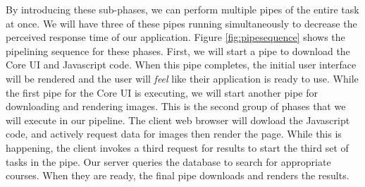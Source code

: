 By introducing these sub-phases, we can perform multiple pipes of the entire
task at once. We will have three of these pipes running simultaneously to
decrease the perceived response time of our application. Figure
\ref{fig:pipesequence} shows the pipelining sequence for these phases. First, we
will start a pipe to download the Core UI and Javascript code. When this pipe
completes, the initial user interface will be rendered and the user will
\textit{feel} like their application is ready to use. While the first pipe for
the Core UI is executing, we will start another pipe for downloading and
rendering images. This is the second group of phases that we will execute in our
pipeline. The client web browser will dowload the Javascript code, and actively
request data for images then render the page. While this is happening, the
client invokes a third request for results to start the third set of tasks in
the pipe. Our server queries the database to search for appropriate courses. 
When they are ready, the final pipe downloads and renders the results.
